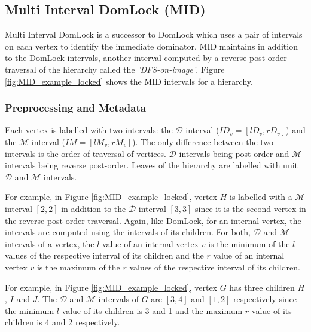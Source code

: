 \subsection{Multi Interval DomLock (MID)}
Multi Interval DomLock \cite{anjuMID} is a successor to DomLock which uses a pair of intervals on each vertex to identify the immediate dominator. MID maintains in addition to the DomLock intervals, another interval computed by a reverse post-order traversal of the hierarchy called the \emph{'DFS-on-image'}. Figure \ref{fig:MID_example_locked} shows the MID intervals for a hierarchy. 

\subsubsection{Preprocessing and Metadata}

Each vertex is labelled with two intervals: the $\mathcal{D}$ interval ($ID_v = [lD_v, rD_v]$) and the $\mathcal{M}$ interval ($IM = [lM_v, rM_v]$). The only difference between the two intervals is the order of traversal of vertices. $\mathcal{D}$ intervals being post-order and $\mathcal{M}$ intervals being reverse post-order. Leaves of the hierarchy are labelled with unit $\mathcal{D}$ and $\mathcal{M}$ intervals. 

For example, in Figure \ref{fig:MID_example_locked}, vertex $H$ is labelled with a $\mathcal{M}$ interval $[2,2]$ in addition to the $\mathcal{D}$ interval $[3,3]$ since it is the second vertex in the reverse post-order traversal. Again, like DomLock, for an internal vertex, the intervals are computed using the intervals of its children. For both, $\mathcal{D}$ and $\mathcal{M}$ intervals of a vertex, the $l$ value of an internal vertex $v$ is the minimum of the $l$ values of the respective interval of its children and the $r$ value of an internal vertex $v$ is the maximum of the $r$ values of the respective interval of its children.

For example, in Figure \ref{fig:MID_example_locked}, vertex $G$ has three children $H$, $I$ and $J$. The $\mathcal{D}$ and $\mathcal{M}$ intervals of $G$ are $[3,4]$ and $[1,2]$ respectively since the minimum $l$ value of its children is 3 and 1 and the maximum $r$ value of its children is 4 and 2 respectively.

